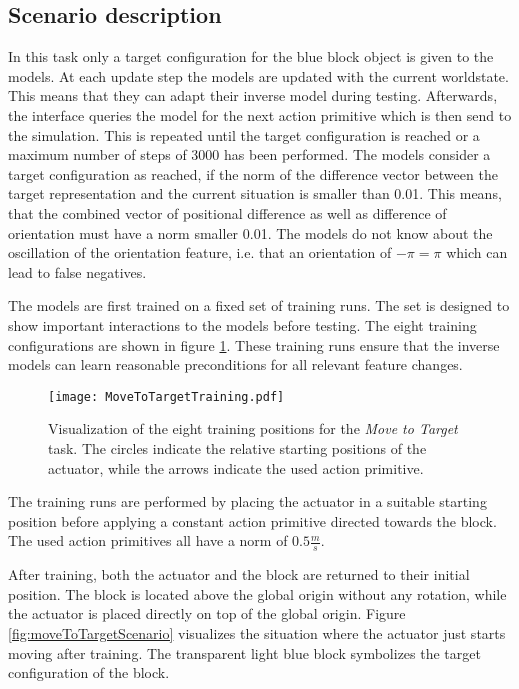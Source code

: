 \subsection{Scenario description}

In this task only a target configuration for the blue block object is given to the models. At each update step the models are updated with the current worldstate.
This means that they can adapt their inverse model during testing.
Afterwards, the interface queries the model for the next action primitive which is then send to the simulation. This is repeated until the target configuration is reached or a maximum number of steps of 3000 has been performed.
The models consider a target configuration as reached, if the norm of the difference vector between the target representation and the current situation is smaller than 0.01. This means, that the combined vector of positional difference as well as difference of orientation must have a norm smaller 0.01. The models do not know about the oscillation of the orientation feature, i.e. that an orientation of $-\pi = \pi$ which can lead to false negatives.

The models are first trained on a fixed set of training runs. The set is designed to show important interactions to the models before testing. The eight training configurations are shown in figure \ref{fig:moveToTargetTraining}.
These training runs ensure that the inverse models can learn reasonable preconditions for all relevant feature changes.

\begin{figure}
\centering
\texttt{[image: MoveToTargetTraining.pdf]}
\caption{Visualization of the eight training positions for the \textit{Move to Target} task. The circles indicate the relative starting positions of the actuator, while the arrows indicate the used action primitive.}
\label{fig:moveToTargetTraining}
\end{figure}

The training runs are performed by placing the actuator in a suitable starting position before applying a constant action primitive directed towards the block.
The used action primitives all have a norm of $0.5\frac{m}{s}$.

After training, both the actuator and the block are returned to their initial position. The block is located  above the global origin without any rotation, while the actuator is placed directly on top of the global origin.
Figure \ref{fig:moveToTargetScenario} visualizes the situation where the actuator just starts moving after training. The transparent light blue block symbolizes the target configuration of the block.

